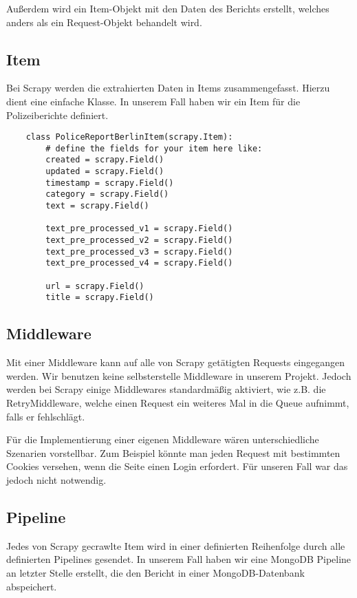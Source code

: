 Außerdem wird ein Item-Objekt mit den Daten des Berichts erstellt, welches anders als ein Request-Objekt behandelt wird.

\subsection{Item}

Bei Scrapy werden die extrahierten Daten in Items zusammengefasst. Hierzu dient eine einfache Klasse.
In unserem Fall haben wir ein Item für die Polizeiberichte definiert.

\begin{verbatim}
    class PoliceReportBerlinItem(scrapy.Item):
        # define the fields for your item here like:
        created = scrapy.Field()
        updated = scrapy.Field()
        timestamp = scrapy.Field()
        category = scrapy.Field()
        text = scrapy.Field()

        text_pre_processed_v1 = scrapy.Field()
        text_pre_processed_v2 = scrapy.Field()
        text_pre_processed_v3 = scrapy.Field()
        text_pre_processed_v4 = scrapy.Field()

        url = scrapy.Field()
        title = scrapy.Field()
\end{verbatim}

\subsection{Middleware}

Mit einer Middleware kann auf alle von Scrapy getätigten Requests eingegangen werden. Wir benutzen keine selbsterstelle
Middleware in unserem Projekt. Jedoch werden bei Scrapy einige Middlewares standardmäßig aktiviert, wie z.B.
die RetryMiddleware, welche einen Request ein weiteres Mal in die Queue aufnimmt, falls er fehlschlägt.

Für die Implementierung einer eigenen Middleware wären unterschiedliche Szenarien vorstellbar. Zum Beispiel könnte man
jeden Request mit bestimmten Cookies versehen, wenn die Seite einen Login erfordert. Für unseren Fall war das jedoch nicht
notwendig.

\subsection{Pipeline}

Jedes von Scrapy gecrawlte Item wird in einer definierten Reihenfolge durch alle definierten Pipelines gesendet.
In unserem Fall haben wir eine MongoDB Pipeline an letzter Stelle erstellt, die den Bericht in einer MongoDB-Datenbank abspeichert.

